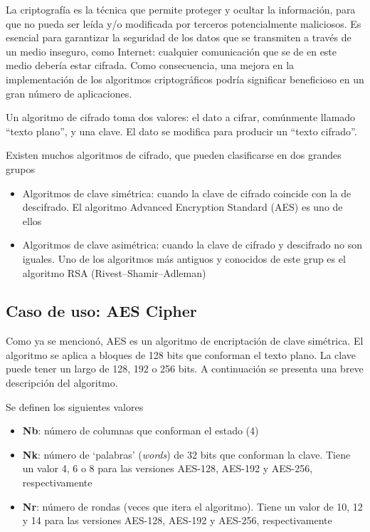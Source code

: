 \documentclass[11pt]{article}
\let\Oldsubsection\subsection
\renewcommand{\subsection}{\FloatBarrier\Oldsubsection}
\begin{document}
La criptografía es la técnica que permite proteger y ocultar la información, para que no pueda ser leída y/o modificada por terceros potencialmente maliciosos. Es esencial para garantizar la seguridad de los datos que se transmiten a través de un medio inseguro, como Internet: cualquier comunicación que se de en este medio debería estar cifrada. Como consecuencia, una mejora en la implementación de los algoritmos criptográficos podría significar beneficioso en un gran número de aplicaciones.

Un algoritmo de cifrado toma dos valores: el dato a cifrar, comúnmente llamado ``texto plano'', y una clave. El dato se modifica para producir un ``texto cifrado''.

Existen muchos algoritmos de cifrado, que pueden clasificarse en dos grandes grupos

\begin{itemize}
    \item Algoritmos de clave simétrica: cuando la clave de cifrado coincide con la de descifrado. El algoritmo Advanced Encryption Standard (AES) \cite{aes:aes} es uno de ellos
    \item Algoritmos de clave asimétrica: cuando la clave de cifrado y descifrado no son iguales. Uno de los algoritmos más antiguos y conocidos de este grup es el algoritmo RSA (Rivest–Shamir–Adleman) \cite{aes:rsa}
\end{itemize}

\subsection{Caso de uso: AES Cipher}

Como ya se mencionó, AES es un algoritmo de encriptación de clave simétrica. El algoritmo se aplica a bloques de 128 bits que conforman el texto plano. La clave puede tener un largo de 128, 192 o 256 bits. A continuación se presenta una breve descripción del algoritmo.

Se definen los siguientes valores

\begin{itemize}
    \item \textbf{Nb}: número de columnas que conforman el estado (4)
    \item \textbf{Nk}: número de `palabras' (\textit{words}) de 32 bits que conforman la clave. Tiene un valor 4, 6 o 8 para las versiones AES-128, AES-192 y AES-256, respectivamente
    \item \textbf{Nr}: número de rondas (veces que itera el algoritmo). Tiene un valor de 10, 12 y 14 para las versiones AES-128, AES-192 y AES-256, respectivamente
\end{itemize}
\end{document}
